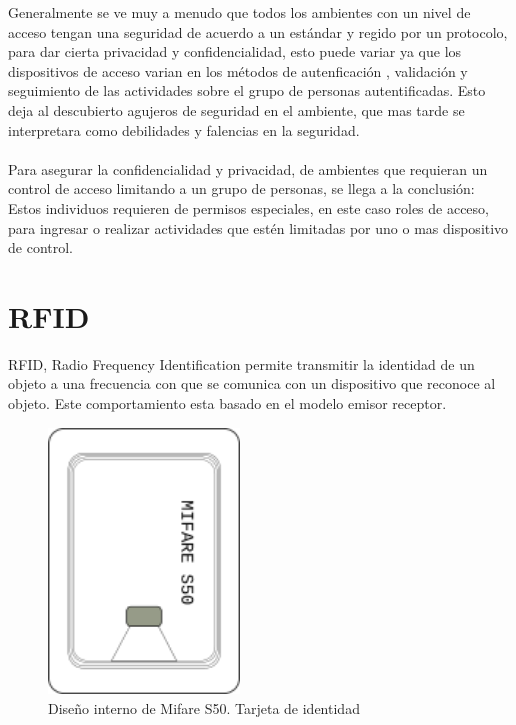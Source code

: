 \documentclass[11pt,twocolumn]{article}
\begin{document}
Generalmente se ve muy a menudo que todos los ambientes  con un nivel de acceso 
tengan una seguridad de acuerdo a un est\'andar y regido por un protocolo, para 
dar cierta privacidad y confidencialidad, esto puede variar ya que los dispositivos 
de acceso varian en los m\'etodos de autenficaci\'on , validaci\'on y seguimiento 
de las actividades sobre el grupo de personas autentificadas. Esto deja al 
descubierto agujeros de seguridad en el ambiente, que mas tarde se interpretara 
como debilidades y falencias en la seguridad.\\
\\
Para asegurar la confidencialidad y privacidad, de ambientes que requieran un 
control de acceso limitando a un grupo de personas, se llega a la conclusi\'on: 
Estos individuos  requieren de permisos especiales, en este caso roles de 
acceso, para ingresar o realizar actividades que est\'en limitadas por uno o mas  
dispositivo de control. \\

\section{RFID}

RFID, Radio Frequency Identification permite transmitir la identidad de un 
objeto a una frecuencia con que se comunica con un dispositivo que reconoce al 
objeto. Este comportamiento esta basado en el modelo emisor receptor. \\

\begin{figure}[t]
  \begin{center}
    \includegraphics[width=2in]{mifare.png}
  \end{center}

  \caption{\small Dise\~no interno de Mifare S50. Tarjeta de identidad}
  \label{fig-label}
\end{figure}
\end{document}
